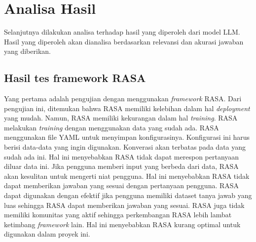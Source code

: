 \section{Analisa Hasil}
\label{sec:analisahasil}

Selanjutnya dilakukan analisa terhadap hasil yang diperoleh dari model LLM. Hasil yang diperoleh akan dianalisa berdasarkan relevansi dan akurasi jawaban yang diberikan. 

\subsection{Hasil tes framework RASA}
Yang pertama adalah pengujian dengan menggunakan \emph{framework} RASA. Dari pengujian ini, ditemukan bahwa RASA memiliki kelebihan dalam hal \emph{deployment} yang mudah. Namun, RASA memiliki kekurangan dalam hal \emph{training}. RASA melakukan \emph{training} dengan menggunakan data yang sudah ada. RASA menggunakan file YAML untuk menyimpan konfigurasinya. Konfigurasi ini harus berisi data-data yang ingin digunakan. Konverasi akan terbatas pada data yang sudah ada ini. Hal ini menyebabkan RASA tidak dapat merespon pertanyaan diluar data ini. Jika pengguna memberi input yang berbeda dari data, RASA akan kesulitan untuk mengerti niat pengguna. Hal ini menyebabkan RASA tidak dapat memberikan jawaban yang sesuai dengan pertanyaan pengguna. RASA dapat digunakan dengan efektif jika pengguna memiliki dataset tanya jawab yang luas sehingga RASA dapat memberikan jawaban yang sesuai. RASA juga tidak memiliki komunitas yang aktif sehingga perkembangan RASA lebih lambat ketimbang \emph{framework} lain. Hal ini menyebabkan RASA kurang optimal untuk digunakan dalam proyek ini.

